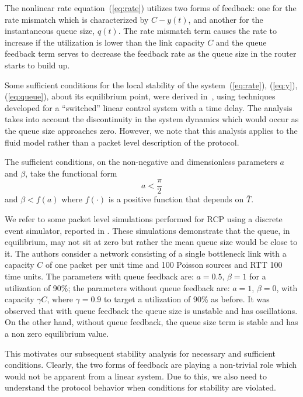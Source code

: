 \documentclass[conference]{IEEEtran}
\begin{document}
The nonlinear rate equation~(\ref{eq:rate}) utilizes two
forms of feedback: one for the rate mismatch which is characterized by
$C - y\left(t\right)$, and another for the instantaneous queue size, $q\left(t\right)$. 
The rate mismatch term causes the rate to increase if the utilization is lower than the 
link capacity $C$ and the queue feedback term serves to decrease the feedback rate as the 
queue size in the router starts to build up.     

Some sufficient conditions for the local stability of the
system~(\ref{eq:rate}), (\ref{eq:y}), (\ref{eq:queue}),
about its equilibrium point, were derived in~\cite{nanswitch},
using techniques developed for a ``switched'' linear control system
with a time delay. The analysis takes into account the discontinuity in the 
system dynamics which would occur as the queue size approaches zero. 
However, we note that this analysis applies to the fluid model rather than a packet level description of the protocol.  

The sufficient conditions, on the non-negative
and dimensionless parameters $a$ and $\beta$, take the functional form
\begin{equation}
a < \frac{\pi}{2}
\label{krveq:cond0a}
\end{equation}
and $\beta < f(a)$ where $f(\cdot)$ is a positive function
that depends on $\overline{T}$.        

We refer to some packet level simulations performed for RCP using a discrete event simulator,
reported in \cite[Fig.~5]{krv}. These simulations demonstrate that the queue, in equilibrium, may not sit at zero but rather the mean queue size would be close to it. The authors consider a network consisting of a single bottleneck link with a capacity $C$ of one packet per unit 
time and 100 Poisson sources and RTT 100 time units. The parameters with queue 
feedback are: $a = 0.5$, $\beta =1$ for a utilization of 90\%; the parameters without queue feedback 
are: $a = 1$, $\beta = 0$, with capacity $\gamma C$, where $\gamma = 0.9$ to target a utilization of 90\% as before. It was observed that with queue feedback the queue size is unstable and has oscillations. On the other hand, 
without queue feedback, the queue size term is 
stable and has a non zero equilibrium value. 

This motivates our subsequent 
stability analysis for necessary and sufficient conditions.
Clearly, the two forms of feedback are playing a non-trivial 
role which would not be apparent from a linear system. 
Due to this, we also need to understand the protocol behavior when conditions for stability are violated.
\end{document}
